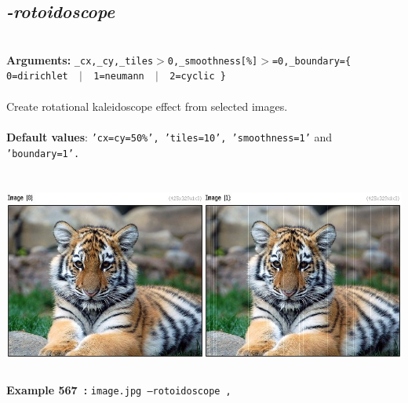 \documentclass[a4paper,11pt,twoside]{book}
\begin{document}
\subsection{\emph{-rotoidoscope} }\vspace*{-0.5em}
~\\\textbf{Arguments: } 
{\small \texttt{\_cx,\_cy,\_tiles$>$0,\_smoothness[\%]$>$=0,\_boundary=\{ 0=dirichlet ~$|$~ 1=neumann ~$|$~ 2=cyclic \}}}\\~\\
Create rotational kaleidoscope effect from selected images.
~\\~\\\textbf{Default values}: {\small \texttt{'cx=cy=50\%', 'tiles=10', 'smoothness=1'} and \texttt{'boundary=1'.}}
\begin{center}\includegraphics[keepaspectratio=true,height=7cm,width=\textwidth]{img/gmic_def567.jpg}\\
{\footnotesize \textbf{Example 567~:} \texttt{image.jpg --rotoidoscope ,}}
\end{center}
\end{document}
